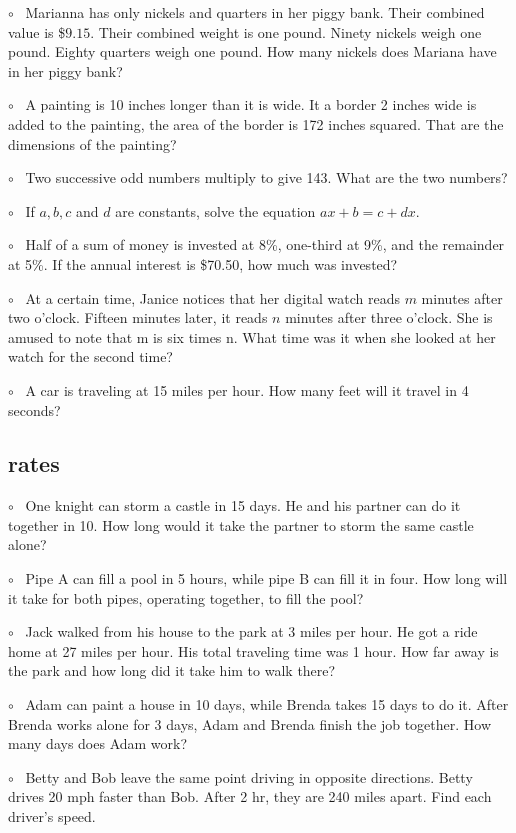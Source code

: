 \documentclass[11pt, oneside]{article}
\begin{document}
$\circ$ \ Marianna has only nickels and quarters in her piggy bank. Their combined value is \$$9.15$. Their combined weight is one pound. Ninety nickels weigh one pound. Eighty quarters weigh one pound. How many nickels does Mariana have in her piggy bank?

$\circ$ \ A painting is 10 inches longer than it is wide.  It a border 2 inches wide is added to the painting, the area of the border is 172 inches squared.  That are the dimensions of the painting?

$\circ$ \ Two successive odd numbers multiply to give 143.  What are the two numbers?

$\circ$ \ If $a,b,c$ and $d$ are constants, solve the equation $ax + b = c + dx$.

$\circ$ \ Half of a sum of money is invested at 8\%, one-third at 9\%, and the remainder at 5\%.  If the annual interest is \$70.50, how much was invested?

$\circ$ \ At a certain time, Janice notices that her digital watch reads $m$ minutes after two o’clock. Fifteen minutes later, it reads $n$ minutes after three o’clock. She is amused to note that m is six times n. What time was it when she looked at her watch for the second time?

$\circ$ \ A car is traveling at 15 miles per hour.  How many feet will it travel in 4 seconds?

\subsection*{rates}

$\circ$ \ One knight can storm a castle in 15 days.  He and his partner can do it together in 10.  How long would it take the partner to storm the same castle alone?

$\circ$ \ Pipe A can fill a pool in 5 hours, while pipe B can fill it in four.  How long will it take for both pipes, operating together, to fill the pool?

$\circ$ \  Jack walked from his house to the park at 3 miles per hour.  He got a ride home at 27 miles per hour.  His total traveling time was 1 hour.  How far away is the park and how long did it take him to walk there?

$\circ$ \ Adam can paint a house in 10 days, while Brenda takes 15 days to do it.  After Brenda works alone for 3 days, Adam and Brenda finish the job together.  How many days does Adam work?

$\circ$ \ Betty and Bob leave the same point driving in opposite directions.  Betty drives 20 mph faster than Bob.  After 2 hr, they are 240 miles apart.  Find each driver's speed.
\end{document}
